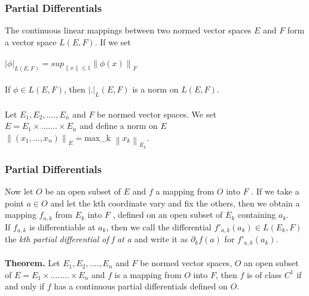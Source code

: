 \documentclass{beamer}
\newcommand\norm[1]{\left\lVert#1\right\rVert}
\begin{document}
\begin{frame}
\frametitle{Partial Differentials}
The continuous linear mappings between two normed vector spaces $E$ and $F$ form a vector space $L(E,F)$. If we set\\~\\
\hspace*{2cm} $|\phi|_{L(E,F)} = sup_{\norm{x} \leq 1} \norm{\phi (x)}_F$\\~\\
If $\phi \in L(E,F)$, then $|.|_L(E,F)$ is a norm on $L(E,F)$.\\~\\

Let $E_1, E_2,....,E_n$ and $F$ be normed vector spaces. We set\\
\hspace{2cm} $E = E_1 \times.......\times E_n$ and define a norm on $E$\\

\hspace*{2cm} $ \norm{(x_1,...,x_n)}_E = $max_k $\norm{x_k}_{E_k}$.\\
\end{frame}



\begin{frame}
\frametitle{Partial Differentials}
Now let $O$ be an open subset of $E$ and $f$ a mapping from $O$ into $F$ . If we take a
point $a \in O$ and let the kth coordinate vary and fix the others, then we obtain a
mapping $f_{a,k}$ from $E_k$ into $F$ , defined on an open subset of $E_k$ containing $a_k$.\\

If $f_{a,k}$ is differentiable at $a_k$, then we call the differential $f'_{a,k}(a_k) \in L(E_k, F)$
the \textit{kth partial differential of f at a} and write it as $\partial_k f(a)$ for $f'_{a,k}(a_k)$. \\~\\

\textbf{Theorem.} Let $E_1,E_2,...., E_n$ and $F$ be normed vector spaces, $O$ an open subset
of $E = E_1 \times........\times E_n$ and $f$ is a mapping from  $O$ into $F$, then $f$ is of class $C^1$ if and only if $f$ has a continuous partial differentials defined on $O$.


\end{frame}
\end{document}
